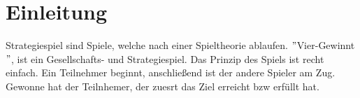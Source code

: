\chapter{Einleitung}
\label{cha:Einleitung}

%
%
%
%
%
%	

Strategiespiel sind Spiele, welche nach einer Spieltheorie ablaufen.
$"$Vier-Gewinnt$"$, ist ein Gesellschafts- und Strategiespiel. Das Prinzip des Spiels ist recht einfach. Ein Teilnehmer beginnt, anschließend ist der andere Spieler am Zug.  Gewonne  hat der Teilnhemer, der zuesrt das Ziel erreicht bzw erfüllt hat.